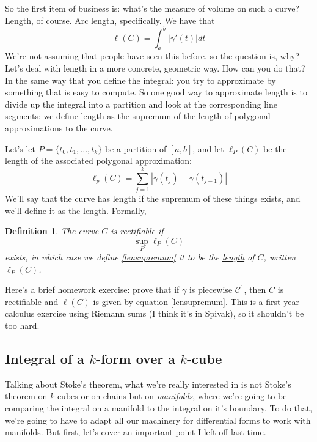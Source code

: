 \documentclass{article}
\newtheorem{definition}{Definition}
\newcommand{\mc}[1]{\mathcal{#1}}
\begin{document}
So the first item of business is: what's the measure of volume on such a curve? Length, of course. Arc length, specifically. We have that
\begin{equation}
  \ell(C) = \int_a^b|\gamma'(t)|dt
\end{equation}
We're not assuming that people have seen this before, so the question is, why? Let's deal with length in a more concrete, geometric way. How can you do that? In the same way that you define the integral: you try to approximate by something that is easy to compute. So one good way to approximate length is to divide up the integral into a partition and look at the corresponding line segments: we define length as the supremum of the length of polygonal approximations to the curve.

Let's let \(P = \{t_0,t_1,...,t_k\}\) be a partition of \([a, b]\), and let \(\ell_P(C)\) be the length of the associated polygonal approximation:
\begin{equation}
  \ell_p(C) = \sum_{j = 1}^k|\gamma(t_j) - \gamma(t_{j - 1})|
\end{equation}
We'll say that the curve has length if the supremum of these things exists, and we'll define it as the length. Formally,
\begin{definition}
  The curve \(C\) is \underline{rectifiable} if
  \begin{equation}
    \sup_P\ell_P(C)
    \label{lensupremum}
  \end{equation}
  exists, in which case we define \ref{lensupremum} it to be the \underline{length} of \(C\), written \(\ell_P(C)\).
\end{definition}
Here's a brief homework exercise: prove that if \(\gamma\) is piecewise \(\mc{C}^1\), then \(C\) is rectifiable and \(\ell(C)\) is given by equation \ref{lensupremum}. This is a first year calculus exercise using Riemann sums (I think it's in Spivak), so it shouldn't be too hard.



\subsection{Integral of a \(k\)-form over a \(k\)-cube}

Talking about Stoke's theorem, what we're really interested in is not Stoke's theorem on \(k\)-cubes or on chains but on \textit{manifolds}, where we're going to be comparing the integral on a manifold to the integral on it's boundary. To do that, we're going to have to adapt all our machinery for differential forms to work with manifolds. But first, let's cover an important point I left off last time.
\end{document}
